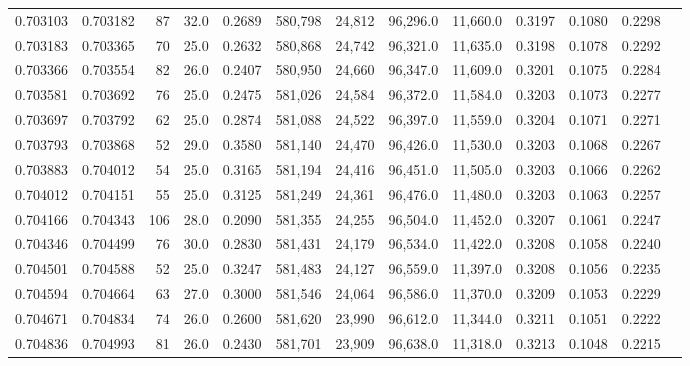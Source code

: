 \begin{tabular}{rrrrrrrrrrrrr}
0.703103 & 0.703182 &    87 & 32.0 &                                     0.2689 & 580,798 &  24,812 &  96,296.0 &  11,660.0 & 0.3197 & 0.1080 & 0.2298 \\
0.703183 & 0.703365 &    70 & 25.0 &                                     0.2632 & 580,868 &  24,742 &  96,321.0 &  11,635.0 & 0.3198 & 0.1078 & 0.2292 \\
0.703366 & 0.703554 &    82 & 26.0 &                                     0.2407 & 580,950 &  24,660 &  96,347.0 &  11,609.0 & 0.3201 & 0.1075 & 0.2284 \\
0.703581 & 0.703692 &    76 & 25.0 &                                     0.2475 & 581,026 &  24,584 &  96,372.0 &  11,584.0 & 0.3203 & 0.1073 & 0.2277 \\
0.703697 & 0.703792 &    62 & 25.0 &                                     0.2874 & 581,088 &  24,522 &  96,397.0 &  11,559.0 & 0.3204 & 0.1071 & 0.2271 \\
0.703793 & 0.703868 &    52 & 29.0 &                                     0.3580 & 581,140 &  24,470 &  96,426.0 &  11,530.0 & 0.3203 & 0.1068 & 0.2267 \\
0.703883 & 0.704012 &    54 & 25.0 &                                     0.3165 & 581,194 &  24,416 &  96,451.0 &  11,505.0 & 0.3203 & 0.1066 & 0.2262 \\
0.704012 & 0.704151 &    55 & 25.0 &                                     0.3125 & 581,249 &  24,361 &  96,476.0 &  11,480.0 & 0.3203 & 0.1063 & 0.2257 \\
0.704166 & 0.704343 &   106 & 28.0 &                                     0.2090 & 581,355 &  24,255 &  96,504.0 &  11,452.0 & 0.3207 & 0.1061 & 0.2247 \\
0.704346 & 0.704499 &    76 & 30.0 &                                     0.2830 & 581,431 &  24,179 &  96,534.0 &  11,422.0 & 0.3208 & 0.1058 & 0.2240 \\
0.704501 & 0.704588 &    52 & 25.0 &                                     0.3247 & 581,483 &  24,127 &  96,559.0 &  11,397.0 & 0.3208 & 0.1056 & 0.2235 \\
0.704594 & 0.704664 &    63 & 27.0 &                                     0.3000 & 581,546 &  24,064 &  96,586.0 &  11,370.0 & 0.3209 & 0.1053 & 0.2229 \\
0.704671 & 0.704834 &    74 & 26.0 &                                     0.2600 & 581,620 &  23,990 &  96,612.0 &  11,344.0 & 0.3211 & 0.1051 & 0.2222 \\
0.704836 & 0.704993 &    81 & 26.0 &                                     0.2430 & 581,701 &  23,909 &  96,638.0 &  11,318.0 & 0.3213 & 0.1048 & 0.2215 \\

\end{tabular}
